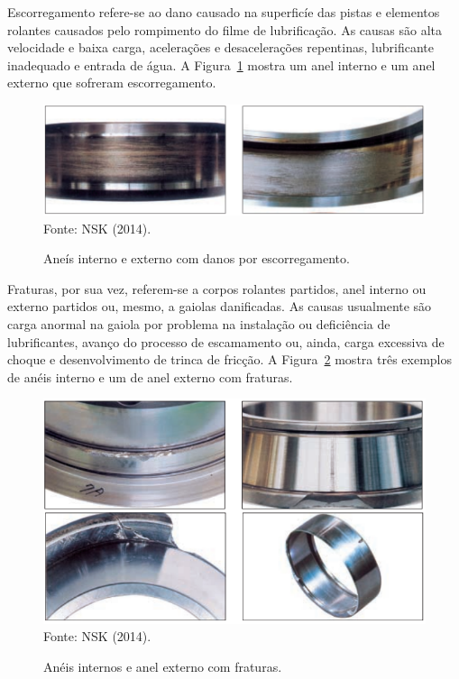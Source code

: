 \documentclass[
	12pt,				
	oneside,			
	a4paper,			
	english,			
	brazil,			
	]{abntex2ppgsi}
\begin{document}
Escorregamento refere-se ao dano causado na superficíe das pistas e elementos rolantes causados pelo rompimento do filme de lubrificação. As causas são alta velocidade e baixa carga, acelerações e desacelerações repentinas, lubrificante inadequado e entrada de água. A Figura~\ref{escorregamento_nsk} mostra um anel interno e um anel externo que sofreram escorregamento. 

\begin{figure}[H]
\centering
\caption {Aneís interno e externo com danos por escorregamento.}
\includegraphics[width=\textwidth,height=\textheight,keepaspectratio]{escorregamento_nsk} \\
Fonte: NSK (2014).
\label{escorregamento_nsk}
\end{figure}

Fraturas, por sua vez, referem-se a corpos rolantes partidos, anel interno ou externo partidos ou, mesmo, a gaiolas danificadas. As causas usualmente são carga anormal na gaiola por problema na instalação ou deficiência de lubrificantes, avanço do processo de escamamento ou, ainda, carga excessiva de choque e desenvolvimento de trinca de fricção. A Figura~\ref{fraturas_nsk} mostra três exemplos de anéis interno e um de anel externo com fraturas. 

\begin{figure}[H]
\centering
\caption {Anéis internos e anel externo com fraturas.}
\includegraphics[width=\textwidth,height=\textheight,keepaspectratio]{fraturas_nsk} \\
Fonte: NSK (2014).
\label{fraturas_nsk}
\end{figure}
\end{document}
